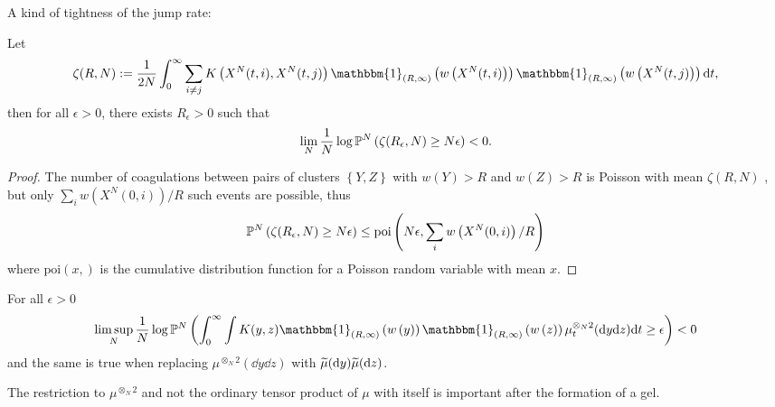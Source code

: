 A kind of tightness of the jump rate:
\begin{proposition}
Let
\begin{equation*}
    \zeta(R,N) := \frac{1}{2N} \int_0^\infty \sum_{i \neq j}K\left(X^N(t,i), X^N(t,j)\right) 
      \mathbbm{1}_{(R,\infty)}\left(w\left(X^N(t,i)\right) \right)
      \mathbbm{1}_{(R,\infty)}\left(w\left(X^N(t,j)\right) \right) \dd t,
\end{equation*}
then for all $\epsilon > 0$, there exists $R_\epsilon > 0$ such that
\begin{equation*}
    \lim_N \frac1N \log \mathbb{P}^N\left(\zeta(R_\epsilon,N) \geq N\epsilon \right) < 0.
\end{equation*}
\end{proposition}
\begin{proof}
The number of coagulations between pairs of clusters $\left\{Y,Z\right\}$ with $w(Y)> R$ and $w(Z) > R$ is Poisson with mean $\zeta(R,N)$ , but only $\sum_i w\left(X^N(0,i)\right) / R$ such events are possible, thus
\begin{equation*}
    \mathbb{P}^N\left(\zeta(R_\epsilon,N) \geq N\epsilon \right)
    \leq
    \mathrm{poi}\left(N\epsilon,  \sum_i w\left(X^N(0,i)\right) / R\right)
\end{equation*}
where $\mathrm{poi}(x, )$ is the cumulative distribution function for a Poisson random variable with mean $x$.
\end{proof}

\begin{corollary}
For all $\epsilon > 0$
\begin{equation*}
\limsup_N \frac1N \log\PP^N\left(
\int_0^\infty \int K(y,z)\mathbbm{1}_{(R,\infty)}\left(w\left(y\right) \right)
      \mathbbm{1}_{(R,\infty)}\left(w\left(z\right) \right) \mu_t^{\otimes_N 2}(\dd y \dd z) \dd t
      \geq \epsilon \right) < 0
\end{equation*}
and the same is true when replacing $\mu^{\otimes_N 2}(\dd y \dd z)$ with $\widetilde{\mu}(\mathrm{d} y) \widetilde{\mu}(\mathrm{d} z)$.
\end{corollary}
The restriction to $\mu^{\otimes_N 2}$ and not the ordinary tensor product of $\mu$ with itself is important after the formation of a gel.